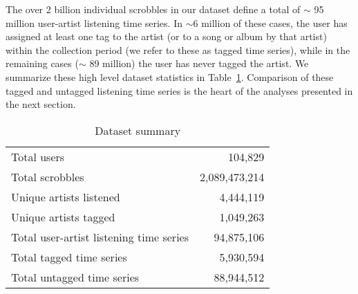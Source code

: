 The over 2 billion individual scrobbles in our dataset define a total of $\sim$ 95 million user-artist listening time series. In $\sim 6$ million of these cases, the user has assigned at least one tag to the artist (or to a song or album by that artist) within the collection period (we refer to these as tagged time series), while in the remaining cases ($\sim$ 89 million) the user has never tagged the artist. We summarize these high level dataset statistics in Table~\ref{tab:data_summary}. Comparison of these tagged and untagged listening time series is the heart of the analyses presented in the next section.

\begin{table}[h]
\begin{center}
\begin{tabular}{l|r}
\toprule
Total users & 104,829 \\
Total scrobbles & 2,089,473,214 \\
Unique artists listened & 4,444,119 \\
Unique artists tagged & 1,049,263 \\
\midrule
Total user-artist listening time series & 94,875,106 \\
Total tagged time series & 5,930,594 \\
Total untagged time series & 88,944,512 \\
\bottomrule
\end{tabular}
\end{center}
\caption{Dataset summary}
\label{tab:data_summary}
\end{table}

